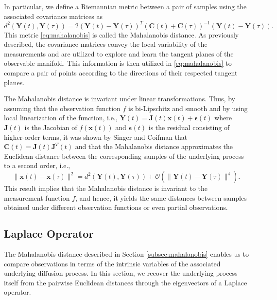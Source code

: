 \documentclass[aip,jcp,preprint]{revtex4-1}
\begin{document}
In particular, we define a Riemannian metric between a pair of samples using the associated covariance matrices as
\begin{equation}
	d^2(\mathbf{Y}(t), \mathbf{Y}(\tau)) = 2 (\mathbf{Y}(t) - \mathbf{Y}(\tau))^T(\mathbf{C}(t) + \mathbf{C}(\tau))^{-1}(\mathbf{Y}(t) - \mathbf{Y}(\tau)).
	\label{eq:mahalanobis}
\end{equation}
This metric \eqref{eq:mahalanobis} is called the Mahalanobis distance.
%
As previously described, the covariance matrices convey the local variability of the measurements and are utilized to explore and learn the tangent planes of the observable manifold.
%
This information is then utilized in \eqref{eq:mahalanobis} to compare a pair of points according to the directions of their respected tangent planes.

The Mahalanobis distance is invariant under linear transformations.
%
Thus, by assuming that the observation function $f$ is bi-Lipschitz and smooth and by using local linearization of the function, i.e., $\mathbf{Y}(t) = \mathbf{J}(t) \mathbf{x}(t) + \boldsymbol{\epsilon}(t)$ where $\mathbf{J}(t)$ is the Jacobian of $f(\mathbf{x}(t))$ and $\boldsymbol{\epsilon}(t)$ is the residual consisting of higher-order terms, it was shown by Singer and Coifman \cite{singer2008non} that $\mathbf{C}(t) = \mathbf{J}(t)\mathbf{J}^T(t)$ and that the Mahalanobis distance approximates the Euclidean distance between the corresponding samples of the underlying process to a second order, i.e.,
\begin{equation}
	\| \mathbf{x}(t) - \mathbf{x}(\tau) \|^2 = d^2(\mathbf{Y}(t), \mathbf{Y}(\tau)) + \mathcal{O}(\| \mathbf{Y}(t) - \mathbf{Y}(\tau)\|^4).
\end{equation}
%
This result implies that the Mahalanobis distance is invariant to the measurement function $f$, and hence,
it yields the same distances between samples obtained under different observation functions or even partial observations.

\subsection{Laplace Operator}
The Mahalanobis distance described in Section \ref{subsec:mahalanobis} enables us to compare observations in terms of the intrinsic variables of the associated underlying diffusion process.
%
In this section, we recover the underlying process itself from the pairwise Euclidean distances through the eigenvectors of a Laplace operator.
\end{document}

